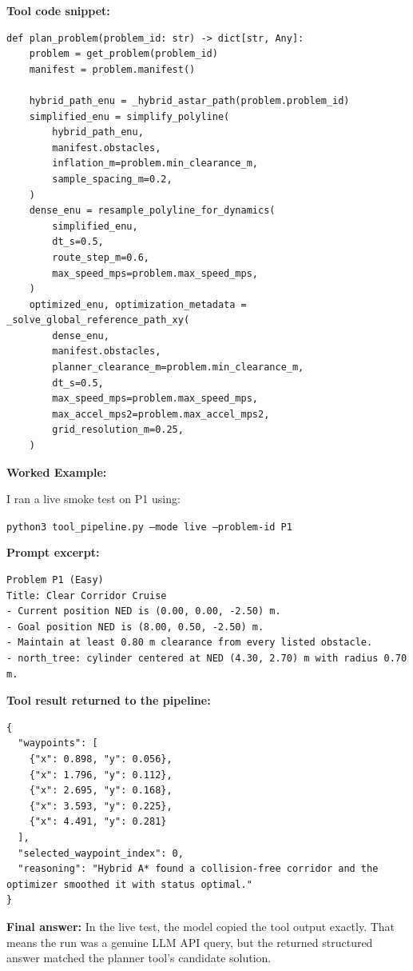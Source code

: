 \documentclass[12pt]{article}
\begin{document}
\medskip
\noindent\textbf{Tool code snippet:}
\begin{lstlisting}[style=pycode]
def plan_problem(problem_id: str) -> dict[str, Any]:
    problem = get_problem(problem_id)
    manifest = problem.manifest()

    hybrid_path_enu = _hybrid_astar_path(problem.problem_id)
    simplified_enu = simplify_polyline(
        hybrid_path_enu,
        manifest.obstacles,
        inflation_m=problem.min_clearance_m,
        sample_spacing_m=0.2,
    )
    dense_enu = resample_polyline_for_dynamics(
        simplified_enu,
        dt_s=0.5,
        route_step_m=0.6,
        max_speed_mps=problem.max_speed_mps,
    )
    optimized_enu, optimization_metadata = _solve_global_reference_path_xy(
        dense_enu,
        manifest.obstacles,
        planner_clearance_m=problem.min_clearance_m,
        dt_s=0.5,
        max_speed_mps=problem.max_speed_mps,
        max_accel_mps2=problem.max_accel_mps2,
        grid_resolution_m=0.25,
    )
\end{lstlisting}

\medskip
\noindent\textbf{Worked Example:}

\medskip
\noindent
I ran a live smoke test on P1 using:
\begin{center}
\texttt{python3 tool\_pipeline.py --mode live --problem-id P1}
\end{center}

\noindent\textbf{Prompt excerpt:}
\begin{lstlisting}[style=textcode]
Problem P1 (Easy)
Title: Clear Corridor Cruise
- Current position NED is (0.00, 0.00, -2.50) m.
- Goal position NED is (8.00, 0.50, -2.50) m.
- Maintain at least 0.80 m clearance from every listed obstacle.
- north_tree: cylinder centered at NED (4.30, 2.70) m with radius 0.70 m.
\end{lstlisting}

\noindent\textbf{Tool result returned to the pipeline:}
\begin{lstlisting}[style=textcode]
{
  "waypoints": [
    {"x": 0.898, "y": 0.056},
    {"x": 1.796, "y": 0.112},
    {"x": 2.695, "y": 0.168},
    {"x": 3.593, "y": 0.225},
    {"x": 4.491, "y": 0.281}
  ],
  "selected_waypoint_index": 0,
  "reasoning": "Hybrid A* found a collision-free corridor and the optimizer smoothed it with status optimal."
}
\end{lstlisting}

\noindent\textbf{Final answer:}
In the live test, the model copied the tool output exactly. That means the run was a genuine
LLM API query, but the returned structured answer matched the planner tool's candidate solution.
\end{document}
